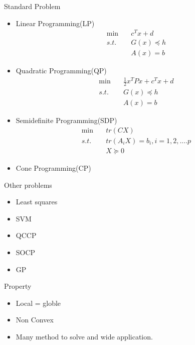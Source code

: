     \begin{frame}{Standard Problem}
      \begin{itemize}
        \item Linear Programming(LP)
        \[
        \begin{aligned}
        \min &\quad c^Tx+d \\
        s.t. &\quad G(x) \preceq h \\
            &\quad A(x) = b
        \end{aligned}
        \]
        \item Quadratic Programming(QP)
        \[
        \begin{aligned}
        \min &\quad \frac{1}{2}x^TPx+c^Tx+d \\
        s.t. &\quad G(x) \preceq h \\
             &\quad A(x) = b
        \end{aligned}
        \]
        \item Semidefinite Programming(SDP)
        \[
        \begin{aligned}
        \min &\quad tr(CX) \\
        s.t. &\quad tr(A_iX)=b_i, i=1,2,....p \\
             &\quad X \succeq 0
        \end{aligned}
        \]
        \item Cone Programming(CP)
      \end{itemize}
    \end{frame}

    \begin{frame}{Other problems}
      \begin{itemize}
        \item Least squares
        \item SVM
        \item QCCP
        \item SOCP
        \item GP
      \end{itemize}
    \end{frame}

    \begin{frame}{Property}
      \begin{itemize}
        \item Local = globle
        \item Non \to Convex
        \item Many method to solve and wide application.
      \end{itemize}
    \end{frame}

